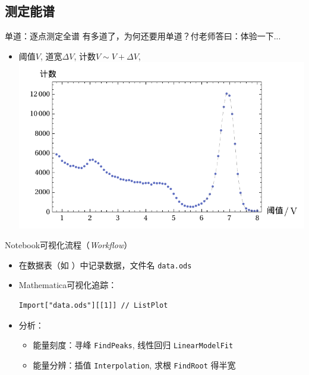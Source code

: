 \documentclass[aspectratio=169,10pt
]{beamer}
\begin{document}
\subsection{测定能谱}
\begin{frame}{单道：逐点测定全谱}{
	有多道了，为何还要用单道？付老师答曰：体验一下...
}
	\begin{itemize}
	\item 阈值$V$, 道宽$\Delta V$, 计数$V\sim V + \Delta V$, \\[.2ex]
		\includegraphics[height=.65\textheight]{../img/plots/spectrumPlot.pdf}
	\end{itemize}
\end{frame}


\begin{frame}[fragile]{Notebook可视化流程（\textit{Workflow}）}{
}
	\begin{itemize}
	\item 在数据表（如 ）中记录数据，文件名 \texttt{data.ods}
	\item Mathematica可视化追踪：
%
\begin{verbatim}
Import["data.ods"][[1]] // ListPlot
\end{verbatim}
%
	\item 分析：
		\begin{itemize}
		\item 能量刻度：寻峰 \verb|FindPeaks|, 线性回归 \verb|LinearModelFit|
		\item 能量分辨：插值 \verb|Interpolation|, 求根 \verb|FindRoot| 得半宽
		\end{itemize}
	\end{itemize}
\end{frame}
\end{document}
